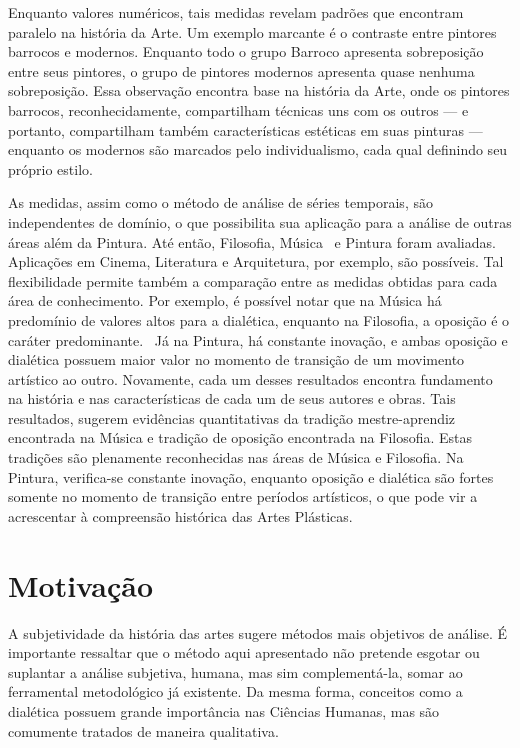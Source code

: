 Enquanto valores numéricos, tais medidas revelam padrões que encontram
paralelo na história da Arte. Um exemplo marcante é o contraste
entre pintores barrocos e
modernos. Enquanto todo o grupo Barroco apresenta sobreposição entre
seus pintores, o grupo de pintores modernos apresenta quase nenhuma
sobreposição. Essa observação encontra base na história da Arte,
onde os pintores barrocos, reconhecidamente, compartilham técnicas uns
com os outros --- e portanto, compartilham também características
estéticas em suas pinturas --- enquanto os modernos são marcados pelo
individualismo, cada qual definindo seu próprio estilo.

As medidas, assim como o método de análise de séries temporais, são
independentes de domínio, o que possibilita sua aplicação para a
análise de outras áreas além da Pintura. Até então, Filosofia,
Música~\cite{vieira} e Pintura foram avaliadas. Aplicações em Cinema,
Literatura e Arquitetura, por exemplo, são possíveis. Tal
flexibilidade permite também a comparação entre as medidas obtidas
para cada área de conhecimento. Por exemplo, é possível notar que na
Música há predomínio de valores altos para a dialética, enquanto na
Filosofia, a oposição é o caráter predominante.~\cite{vieira} Já na
Pintura, há constante inovação, e ambas oposição e dialética possuem
maior valor no momento de transição de um movimento artístico ao
outro. Novamente, cada um desses resultados encontra fundamento na
história e nas características de cada um de seus autores e
obras. Tais resultados, sugerem evidências quantitativas da tradição
mestre-aprendiz encontrada na Música e tradição de oposição encontrada
na Filosofia. Estas tradições são plenamente reconhecidas nas áreas de
Música e Filosofia. Na Pintura, verifica-se constante inovação,
enquanto oposição e dialética são fortes somente no momento de
transição entre períodos artísticos, o que pode vir a acrescentar à
compreensão histórica das Artes Plásticas.

\section{Motivação}

A subjetividade da história das artes sugere métodos mais objetivos de
análise. É importante ressaltar que o método aqui apresentado não
pretende esgotar ou suplantar a análise subjetiva, humana, mas sim
complementá-la, somar ao ferramental metodológico já existente. Da
mesma forma, conceitos como a dialética possuem grande importância nas
Ciências Humanas, mas são comumente tratados de maneira qualitativa.

